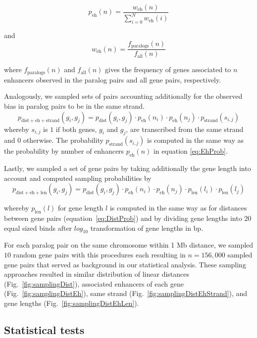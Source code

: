 \documentclass[a4paper,twoside=true,openright,parskip=full,chapterprefix=true,11pt,headings=normal,bibliography=totoc,listof=totoc,titlepage=on,captions=tableabove,draft=false]{scrreprt}
\theoremstyle{definition}
\theoremstyle{definition}
\theoremstyle{definition}
\theoremstyle{remark}
\begin{document}
\[
p_{\mathrm{eh}}(n) = \frac{ w_{\mathrm{eh}}(n) }{ \sum_{i=0}^{N} w_{\mathrm{eh}}(i) }
\label{eq:EhProb}
\]

and \[
w_{\mathrm{eh}}(n) = \frac{ f_{\mathrm{paralogs}}(n) }{f_{\mathrm{all}}(n)}
\]

where \(f_{\mathrm{paralogs}}(n)\) and \(f_{\mathrm{all}}(n)\) gives the
frequency of genes associated to \(n\) enhancers observed in the paralog
pairs and all gene pairs, respectively.

Analogously, we sampled sets of pairs accounting additionally for the
observed bias in paralog pairs to be in the same strand. \[
p_{\mathrm{dist+eh+strand}}(g_{i}, g_{j}) = p_{\mathrm{dist}}(g_{i}, g_{j}) \cdot p_{\mathrm{eh}}(n_{i}) \cdot p_{\mathrm{eh}}(n_{j}) \cdot p_{\mathrm{strand}}(s_{i,j})
\] whereby \(s_{i,j}\) is \(1\) if both genes, \(g_{i}\) and \(g_{j}\),
are transcribed from the same strand and \(0\) otherwise. The
probability \(p_{\mathrm{strand}}(s_{i,j})\) is computed in the same way
as the probability by number of enhancers \(p_{\mathrm{eh}}(n)\) in
equation \eqref{eq:EhProb}.

Lastly, we sampled a set of gene pairs by taking additionally the gene
length into account and computed sampling probabilities by \[
p_{\mathrm{dist+eh+len}}(g_{i}, g_{j}) = p_{\mathrm{dist}}(g_{i}, g_{j}) \cdot p_{\mathrm{eh}}(n_{i}) \cdot p_{\mathrm{eh}}(n_{j}) \cdot p_{\mathrm{len}}(l_{i}) \cdot p_{\mathrm{len}}(l_{j})
\]

whereby \(p_{\mathrm{len}}(l)\) for gene length \(l\) is computed in the
same way as for distances between gene pairs
(equation~\eqref{eq:DistProb}) and by dividing gene lengths into 20 equal
sized binds after \(log_{10}\) transformation of gene lengths in bp.

For each paralog pair on the same chromosome within 1 Mb distance, we
sampled \(10\) random gene pairs with this procedures each resulting in
\(n=156,000\) sampled gene pairs that served as background in our
statistical analysis. These sampling approaches resulted in similar
distribution of linear distances (Fig.~\ref{fig:samplingDist}),
associated enhancers of each gene (Fig.~\ref{fig:samplingDistEh}), same
strand (Fig.~\ref{fig:samplingDistEhStrand}), and gene lengths
(Fig.~\ref{fig:samplingDistEhLen}).

\subsection{Statistical tests}\label{statistical-tests}
\end{document}
